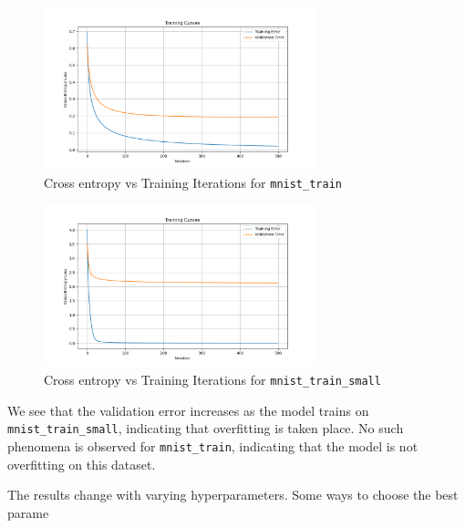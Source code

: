 \documentclass{article}
\begin{document}
\begin{enumerate}[3.1]
\begin{enumerate}[(a)]
        \begin{figure}[H]
            \centering
            \includegraphics[width=0.7\textwidth]{../figures/mnist_train.png}
            \caption{Cross entropy vs Training Iterations for \texttt{mnist\_train}}
            \label{fig:q3b_mnist_train_cross_entropy}
        \end{figure}

        \begin{figure}[H]
            \centering
            \includegraphics[width=0.7\textwidth]{../figures/mnist_train_small.png}
            \caption{Cross entropy vs Training Iterations for \texttt{mnist\_train\_small}}
            \label{fig:q3b_mnist_train_small_cross_entropy}
        \end{figure}

        We see that the validation error increases as the model trains on \texttt{mnist\_train\_small}, indicating that overfitting is taken place. No such phenomena is observed for \texttt{mnist\_train}, indicating that the model is not overfitting on this dataset.

        The results change with varying hyperparameters. Some ways to choose the best parame

    \end{enumerate}
\end{enumerate}
\end{document}
